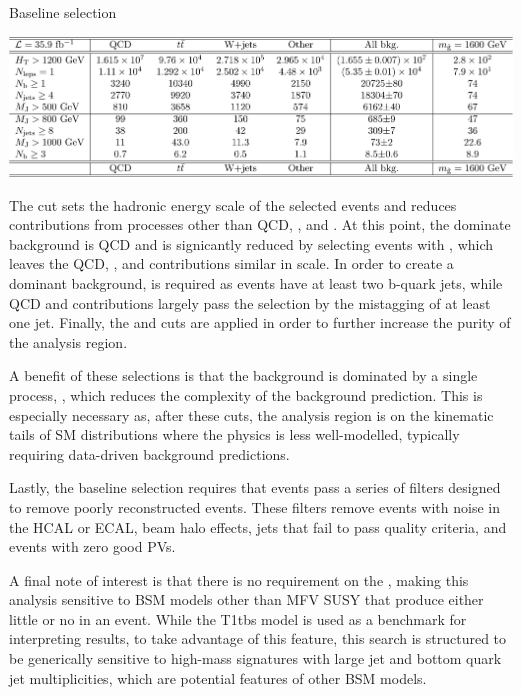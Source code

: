 \begin{section}{Baseline selection}
\begin{table}[tbp!]
\centering
\includegraphics[angle=0,width=0.90\columnwidth]{fig/cutflow.pdf}
\caption{Expected yields in $35~\ifb$ from simulations of SM and signal processes.
Rows above the horizontal line correspond to requirements in the baseline selection, while those below correspond to additional kinematic cuts.}
\label{tab:cutflow}
\end{table}

The \baseHT cut sets the hadronic energy scale of the selected events and reduces contributions from processes other than QCD, \ttbar, and \Wjets.
At this point, the dominate background is QCD and is signicantly reduced by selecting events with \baseNleps, which leaves the QCD, \ttbar, and \Wjets contributions similar in scale.
In order to create a \ttbar dominant background, \baseNb is required as \ttbar events have at least two b-quark jets, while QCD and \Wjets contributions largely pass the selection by the mistagging of at least one jet.
Finally, the \baseNjets and \baseMJ cuts are applied in order to further increase the \ttbar purity of the analysis region.

A benefit of these selections is that the background is dominated by a single process, \ttbar, which reduces the complexity of the background prediction.
This is especially necessary as, after these cuts, the analysis region is on the kinematic tails of SM distributions where the physics is less well-modelled, typically requiring data-driven background predictions.

Lastly, the baseline selection requires that events pass a series of filters designed to remove poorly reconstructed events. 
These filters remove events with noise in the HCAL or ECAL, beam halo effects, jets that fail to pass quality criteria, and events with zero good PVs.

A final note of interest is that there is no requirement on the \MET, making this analysis sensitive to BSM models other than MFV SUSY that produce either little or no \MET in an event.
While the T1tbs model is used as a benchmark for interpreting results, to take advantage of this feature, this search is structured to be generically sensitive to high-mass signatures with large jet and bottom quark jet multiplicities, which are potential features of other BSM models.

\end{section}


